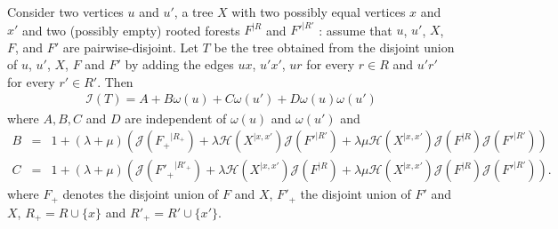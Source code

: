 \documentclass[11 pt]{modarticle}
\newcommand{\wmap}{\omega}
\newcommand{\rtree}[2]{{#1}^{\lvert #2}}
\newcommand{\indexsymbol}{\mathcal{I}}
\newcommand{\tindex}[1]{\indexsymbol(#1)}
\newcommand{\rindexsymbol}{\mathcal{J}}
\newcommand{\rindex}[2]{\rindexsymbol(\rtree{#2}{#1})}
\newcommand{\aindexsymbol}{\mathcal{H}}
\newcommand{\aindex}[3]{\aindexsymbol(\rtree{#3}{#1, #2})}
\begin{document}
\begin{lem}\label{lem:tindex-decomp-2}
Consider two vertices $u$ and $u'$, a tree $X$ with two possibly equal vertices $x$ and $x'$ and two (possibly empty) rooted forests $\rtree{F}{R}$ and $\rtree{F'}{R'}$ : assume that $u$, $u'$, $X$, $F$, and $F'$ are pairwise-disjoint. Let $T$ be the tree obtained from the disjoint union of $u$, $u'$, $X$, $F$ and $F'$ by adding the edges $ux$, $u'x'$, $ur$ for every $r \in R$ and $u'r'$ for every $r' \in R'$. Then
\begin{eqnarray*}
	\tindex{T} = A + B \wmap(u) + C \wmap(u') + D \wmap(u) \wmap(u')
\end{eqnarray*}
where $A,B,C$ and $D$ are independent of $\wmap(u)$ and $\wmap(u')$ and
\begin{eqnarray*}
	B & = & 1 + (\lambda + \mu) \left(\rindex{R_+}{F_+} + \lambda \aindex{x}{x'}{X} \rindex{R'}{F'} + \lambda \mu \aindex{x}{x'}{X} \rindex{R}{F} \rindex{R'}{F'}\right) \\
	C & = & 1 + (\lambda + \mu) \left(\rindex{R'_+}{F'_+} + \lambda \aindex{x}{x'}{X} \rindex{R}{F} + \lambda \mu \aindex{x}{x'}{X} \rindex{R}{F} \rindex{R'}{F'}\right) .
\end{eqnarray*}
where $F_+$ denotes the disjoint union of $F$ and $X$, $F'_+$ the disjoint union of $F'$ and $X$, $R_+ = R \cup \{x\}$ and $R'_+ = R' \cup \{x'\}$.
\end{lem}
\end{document}
